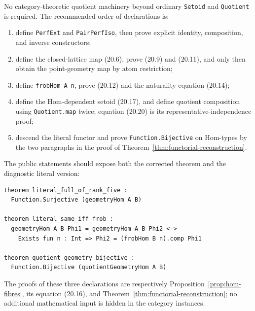 \documentclass[11pt,oneside]{article}
\theoremstyle{definition}
\theoremstyle{remark}
\newcommand{\lean}[1]{\nolinkurl{#1}}
\begin{document}
No category-theoretic quotient machinery beyond ordinary \lean{Setoid} and
\lean{Quotient} is required.  The recommended order of declarations is:
\begin{enumerate}[leftmargin=9mm]
\item define \lean{PerfExt} and \lean{PairPerfIso}, then prove explicit identity,
composition, and inverse constructors;
\item define the closed-lattice map (20.6), prove (20.9) and (20.11), and only then obtain
the point-geometry map by atom restriction;
\item define \lean{frobHom A n}, prove (20.12) and the naturality equation (20.14);
\item define the Hom-dependent setoid (20.17), and define quotient composition using
\lean{Quotient.map} twice; equation (20.20) is its representative-independence proof;
\item descend the literal functor and prove \lean{Function.Bijective} on Hom-types by the
two paragraphs in the proof of Theorem~\ref{thm:functorial-reconstruction}.
\end{enumerate}
The public statements should expose both the corrected theorem and the diagnostic literal
version:
\begin{lstlisting}
theorem literal_full_of_rank_five :
  Function.Surjective (geometryHom A B)

theorem literal_same_iff_frob :
  geometryHom A B Phi1 = geometryHom A B Phi2 <->
    Exists fun n : Int => Phi2 = (frobHom B n).comp Phi1

theorem quotient_geometry_bijective :
  Function.Bijective (quotientGeometryHom A B)
\end{lstlisting}
The proofs of these three declarations are respectively
Proposition~\ref{prop:hom-fibres}, its equation (20.16), and
Theorem~\ref{thm:functorial-reconstruction}; no additional mathematical input is hidden in
the category instances.
\end{document}
